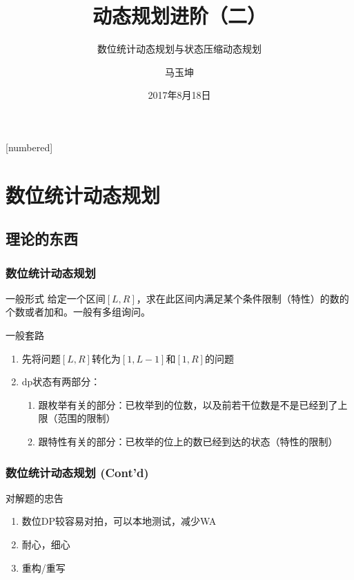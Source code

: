 \documentclass[hyperref={unicode=true}]{beamer}
\theoremstyle{definition}
\theoremstyle{proof}
\begin{document}
[numbered]
\renewcommand\figurename{图}
\renewcommand\tablename{表}
\renewcommand\contentsname{\centering 目录}


\title{动态规划进阶（二）}
\subtitle{数位统计动态规划与状态压缩动态规划}
\author{马玉坤}
\date{2017年8月18日}

\begin{frame}\titlepage\end{frame}

\section{数位统计动态规划}

\subsection{理论的东西}
\begin{frame}\frametitle{数位统计动态规划}
  \begin{block}{一般形式}
    给定一个区间$[L,R]$，求在此区间内满足某个条件限制（特性）的数的个数或者加和。一般有多组询问。
  \end{block}
  \begin{exampleblock}{一般套路}
    \begin{enumerate}[<+->]
    \item 先将问题$[L,R]$转化为$[1,L-1]$和$[1,R]$的问题
    \item dp状态有两部分：
      \begin{enumerate}
      \item 跟枚举有关的部分：已枚举到的位数，以及前若干位数是不是已经到了上限（范围的限制）
      \item 跟特性有关的部分：已枚举的位上的数已经到达的状态（特性的限制）
      \end{enumerate}
    \end{enumerate}
  \end{exampleblock}
\end{frame}
\begin{frame}\frametitle{数位统计动态规划 (Cont'd)}
  \begin{alertblock}{对解题的忠告}
    \begin{enumerate}[<+->]
    \item 数位DP较容易对拍，可以本地测试，减少WA
    \item 耐心，细心
    \item 重构/重写
    \end{enumerate}
  \end{alertblock}
\end{frame}
\end{document}
